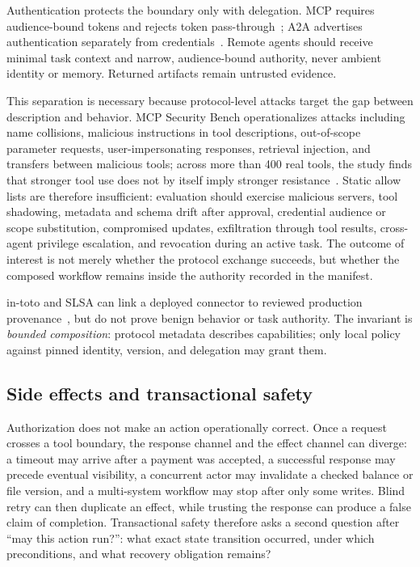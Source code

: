 Authentication protects the boundary only with delegation. MCP requires audience-bound tokens and rejects token pass-through~\cite{mcp2025spec}; A2A advertises authentication separately from credentials~\cite{a2a2026spec}. Remote agents should receive minimal task context and narrow, audience-bound authority, never ambient identity or memory. Returned artifacts remain untrusted evidence.

This separation is necessary because protocol-level attacks target the gap between description and behavior. MCP Security Bench operationalizes attacks including name collisions, malicious instructions in tool descriptions, out-of-scope parameter requests, user-impersonating responses, retrieval injection, and transfers between malicious tools; across more than 400 real tools, the study finds that stronger tool use does not by itself imply stronger resistance~\cite{zhang2025mcpsecuritybench}. Static allow lists are therefore insufficient: evaluation should exercise malicious servers, tool shadowing, metadata and schema drift after approval, credential audience or scope substitution, compromised updates, exfiltration through tool results, cross-agent privilege escalation, and revocation during an active task. The outcome of interest is not merely whether the protocol exchange succeeds, but whether the composed workflow remains inside the authority recorded in the manifest.

in-toto and SLSA can link a deployed connector to reviewed production provenance~\cite{torresarias2019intoto,slsa2026provenance}, but do not prove benign behavior or task authority. The invariant is \emph{bounded composition}: protocol metadata describes capabilities; only local policy against pinned identity, version, and delegation may grant them.

\subsection{Side effects and transactional safety}

Authorization does not make an action operationally correct. Once a request crosses a tool boundary, the response channel and the effect channel can diverge: a timeout may arrive after a payment was accepted, a successful response may precede eventual visibility, a concurrent actor may invalidate a checked balance or file version, and a multi-system workflow may stop after only some writes. Blind retry can then duplicate an effect, while trusting the response can produce a false claim of completion. Transactional safety therefore asks a second question after ``may this action run?'': what exact state transition occurred, under which preconditions, and what recovery obligation remains?

